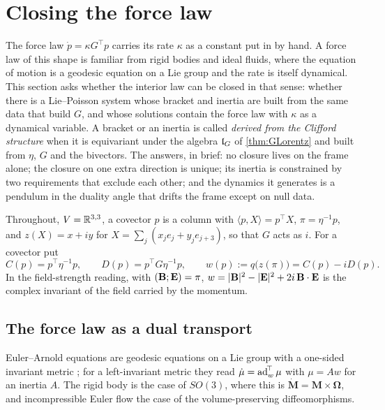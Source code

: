 \section{Closing the force law}
\label{sec:closure}

The force law $\dot p=\kappa G^{\!\top}p$ carries its rate $\kappa$ as a constant put in by hand. A force law of this shape is familiar from
rigid bodies and ideal fluids, where the equation of motion is a geodesic equation on a Lie group and the rate is itself dynamical. This
section asks whether the interior law can be closed in that sense: whether there is a Lie--Poisson system whose bracket and inertia are built
from the same data that build $G$, and whose solutions contain the force law with $\kappa$ as a dynamical variable. A bracket or an inertia is
called \emph{derived from the Clifford structure} when it is equivariant under the algebra $\mathfrak l_G$ of \cref{thm:GLorentz} and built from
$\eta$, $G$ and the bivectors. The answers, in brief: no closure lives on the frame alone; the closure on one extra direction is unique; its
inertia is constrained by two requirements that exclude each other; and the dynamics it generates is a pendulum in the duality angle that
drifts the frame except on null data.

Throughout, $V=\mathbb{R}^{3,3}$, a covector $p$ is a column with $\langle p,X\rangle=p^{\!\top}X$, $\pi=\eta^{-1}p$, and $z(X)=x+iy$ for
$X=\sum_j(x_je_j+y_je_{j+3})$, so that $G$ acts as $i$. For a covector put
\begin{equation}
\label{eq:wdef}
C(p)=p^{\!\top}\eta^{-1}p,\qquad D(p)=p^{\!\top}G\eta^{-1}p,\qquad w(p):=q\bigl(z(\pi)\bigr)=C(p)-iD(p).
\end{equation}
In the field-strength reading, with $(\mathbf B;\mathbf E)=\pi$, $w=|\mathbf B|^2-|\mathbf E|^2+2i\,\mathbf B\cdot\mathbf E$ is the complex invariant of the field carried by the
momentum.

\subsection{The force law as a dual transport}

Euler--Arnold equations are geodesic equations on a Lie group with a one-sided invariant metric \cite{Arnold66,ArnoldKhesin98}; for a
left-invariant metric they read $\dot\mu=\operatorname{ad}_w^{\!\top}\mu$ with $\mu=Aw$ for an inertia $A$. The rigid body is the case of $SO(3)$, where this is
$\dot{\mathbf M}=\mathbf M\times\boldsymbol\Omega$, and incompressible Euler flow the case of the volume-preserving diffeomorphisms.

